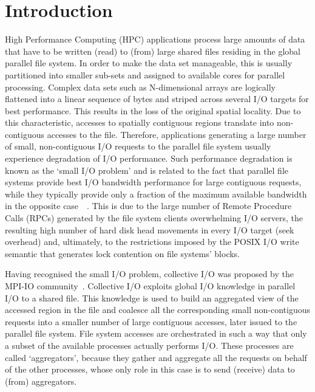 \section{Introduction}
\label{sec: introduction}

High Performance Computing (HPC) applications process large amounts of data that have to be written (read) to (from) large shared files residing in the global parallel file system. In order to make the data set manageable, this is usually partitioned into smaller sub-sets and assigned to available cores for parallel processing. Complex data sets such as N-dimensional arrays are logically flattened into a linear sequence of bytes and striped across several I/O targets for best performance. This results in the loss of the original spatial locality. Due to this characteristic, accesses to spatially contiguous regions translate into non-contiguous accesses to the file. Therefore, applications generating a large number of small, non-contiguous I/O requests to the parallel file system usually experience degradation of I/O performance. Such performance degradation is known as the `small I/O problem' and is related to the fact that parallel file systems provide best I/O bandwidth performance for large contiguous requests, while they typically provide only a fraction of the maximum available bandwidth in the opposite case~\cite{ChingCLP06}~\cite{HeSSYT11}. This is due to the large number of Remote Procedure Calls (RPCs) generated by the file system clients overwhelming I/O servers, the resulting high number of hard disk head movements in every I/O target (seek overhead) and, ultimately, to the restrictions imposed by the POSIX I/O write semantic that generates lock contention on file systems' blocks.

Having recognised the small I/O problem, collective I/O was proposed by the MPI-IO community~\cite{ThakurGL99}. Collective I/O exploits global I/O knowledge in parallel I/O to a shared file. This knowledge is used to build an aggregated view of the accessed region in the file and coalesce all the corresponding small non-contiguous requests into a smaller number of large contiguous accesses, later issued to the parallel file system. File system accesses are orchestrated in such a way that only a subset of the available processes actually performs I/O. These processes are called `aggregators', because they gather and aggregate all the requests on behalf of the other processes, whose only role in this case is to send (receive) data to (from) aggregators.

